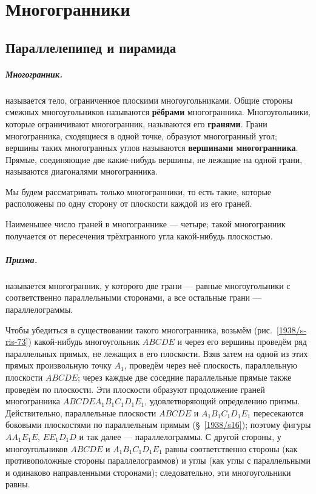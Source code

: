 \chapter{Многогранники}


\section{Параллелепипед и пирамида}

\paragraph{Многогранник.}\label{1938/s67}
 называется тело, ограниченное плоскими многоугольниками.
Общие стороны смежных многоугольников называются \textbf{рёбрами} многогранника.
Многоугольники, которые ограничивают многогранник, называются его \textbf{гранями}.
Грани многогранника, сходящиеся в одной точке, образуют многогранный угол;
вершины таких многогранных углов называются \textbf{вершинами многогранника}.
Прямые, соединяющие две какие-нибудь вершины, не лежащие на одной грани, называются диагоналями многогранника.

Мы будем рассматривать только  многогранники, то есть такие, которые расположены по одну сторону от плоскости каждой из его граней.

Наименьшее число граней в многограннике — четыре;
такой многогранник получается от пересечения трёхгранного угла какой-нибудь плоскостью.

\paragraph{Призма.}\label{1938/s68}
 называется многогранник, у которого две грани — равные многоугольники с соответственно параллельными сторонами, а все остальные грани — параллелограммы.

Чтобы убедиться в существовании такого многогранника, возьмём (рис.~\ref{1938/s-ris-73}) какой-нибудь многоугольник $ABCDE$ и через его вершины проведём ряд параллельных прямых, не лежащих в его плоскости.
Взяв затем на одной из этих прямых произвольную точку $A_1$, проведём через неё плоскость, параллельную плоскости $ABCDE$;
через каждые две соседние параллельные прямые также проведём по плоскости.
Эти плоскости образуют продолжение граней многогранника $ABCDEA_1B_1C_1D_1E_1$, удовлетворяющий определению призмы.
Действительно, параллельные плоскости $ABCDE$ и $A_1B_1C_1D_1E_1$ пересекаются боковыми плоскостями по параллельным прямым (§~\ref{1938/s16});
поэтому фигуры $AA_1E_1E$, $EE_1D_1D$ и так далее — параллелограммы.
С другой стороны, у многоугольников $ABCDE$ и $A_1B_1C_1D_1E_1$ равны соответственно стороны (как противоположные стороны параллелограммов) и углы (как углы с параллельными и одинаково направленными сторонами);
следовательно, эти многоугольники равны.

